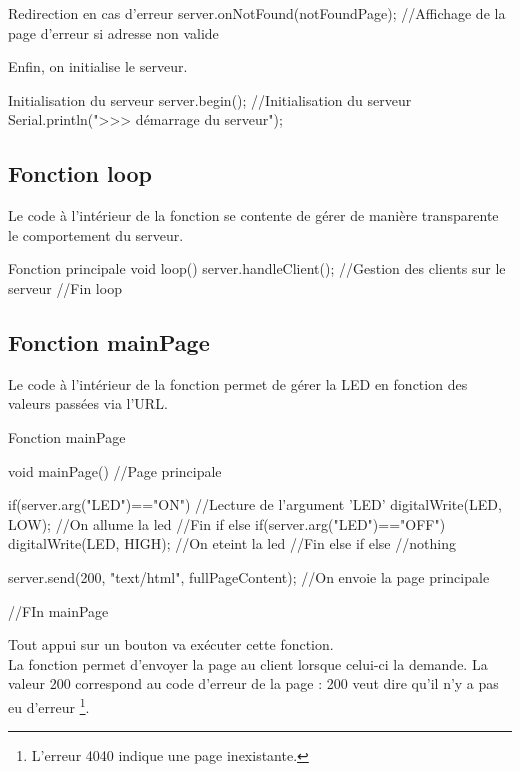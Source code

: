 \begin{Cpp}{Redirection en cas d'erreur}
    server.onNotFound(notFoundPage);    //Affichage de la page d'erreur si adresse non valide
\end{Cpp}

Enfin, on initialise le serveur.

\begin{Cpp}{Initialisation du serveur}
    server.begin();                     //Initialisation du serveur
    Serial.println(">>> démarrage du serveur");
\end{Cpp}

\subsection{Fonction loop}

Le code à l'intérieur de la fonction  se contente de gérer de manière transparente le comportement du serveur.
\begin{Cpp}{Fonction principale}
void loop() 
{
    server.handleClient(); //Gestion des clients sur le serveur
}//Fin loop
\end{Cpp}


\subsection{Fonction mainPage}

Le code à l'intérieur de la fonction  permet de gérer la LED en fonction des 
valeurs passées via l'URL.


\begin{Cpp}{Fonction mainPage}

void mainPage() //Page principale
{ 

 if(server.arg("LED")=="ON") //Lecture de l'argument 'LED'
 {
  digitalWrite(LED, LOW); //On allume la led
 }//Fin if
 else if(server.arg("LED")=="OFF")
 {
 digitalWrite(LED, HIGH);   //On eteint la led
 }//Fin else if
 else {
  //nothing
 }

 server.send(200, "text/html", fullPageContent); //On envoie la page principale
  
}//FIn mainPage

\end{Cpp}

Tout appui sur un bouton va exécuter cette fonction.\\
La fonction  permet d'envoyer la page au client lorsque celui-ci la demande.
La valeur 200 correspond au code d'erreur de la page : 200 veut dire qu'il n'y a pas eu d'erreur \footnote{L'erreur 4040 indique une page inexistante.}.


